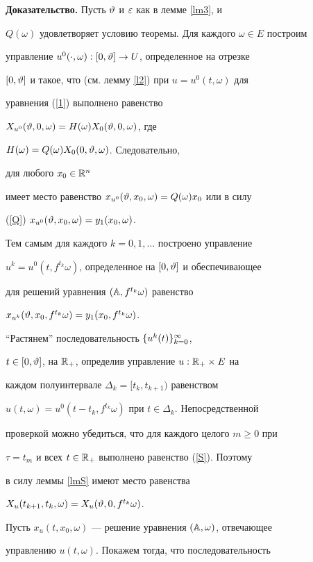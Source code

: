 {\bf Доказательство.} Пусть $\vartheta$ и $\varepsilon$ как в лемме \ref{lm3}, и


$Q(\omega)$ удовлетворяет условию теоремы. Для каждого $\omega\in E$ построим


управление $u^0(\cdot,\omega):[0,\vartheta]\to U$, определенное на отрезке


$[0,\vartheta]$ и такое, что (см. лемму \ref{l2}) при $u=u^0(t,\omega)$ для


уравнения (\ref{1}) выполнено равенство


$X_{u^0}(\vartheta,0,\omega)=H(\omega)X_0(\vartheta,0,\omega)$, где


$H(\omega)=Q(\omega)X_0(0,\vartheta,\omega)$. Следовательно,


для любого $x_0\in\Bbb R^n$


имеет место равенство $x_{u^0}(\vartheta,x_0,\omega)=Q(\omega)x_0$ или в силу


(\ref{Q}) $x_{u^0}(\vartheta,x_0,\omega)=y_1(x_0,\omega)$.





Тем самым для каждого $k=0,1,\dotsc$ построено управление


$u^k=u^0(t,f^{t_k}\omega)$, определенное на $[0,\vartheta]$ и обеспечивающее


для решений уравнения $(\Bbb A,f^{t_k}\omega)$ равенство


$x_{u^k}(\vartheta,x_0,f^{t_k}\omega)=y_1(x_0,f^{t_k}\omega)$.





``Растянем'' последовательность $\{u^k(t)\}^{\infty}_{k=0}$,


$t\in [0,\vartheta]$, на $\Bbb R_+$, определив управление $u:\Bbb R_+\times E$ на


каждом полуинтервале $\Delta_k=[t_k,t_{k+1})$ равенством


$u(t,\omega)=u^0(t-t_k,f^{t_k}\omega)$ при $t\in\Delta_k$. Непосредственной


проверкой можно убедиться, что для каждого целого $m\ge 0$ при


$\tau=t_m$ и всех $t\in\Bbb R_+$ выполнено равенство (\ref{S}). Поэтому


в силу леммы \ref{lmS} имеют место равенства


$X_u(t_{k+1},t_k,\omega)=X_u(\vartheta,0,f^{t_k}\omega)$.





Пусть $x_u(t,x_0,\omega)$ --- решение уравнения $(\Bbb A,\omega)$, отвечающее


управлению $u(t,\omega)$. Покажем тогда, что последовательность


